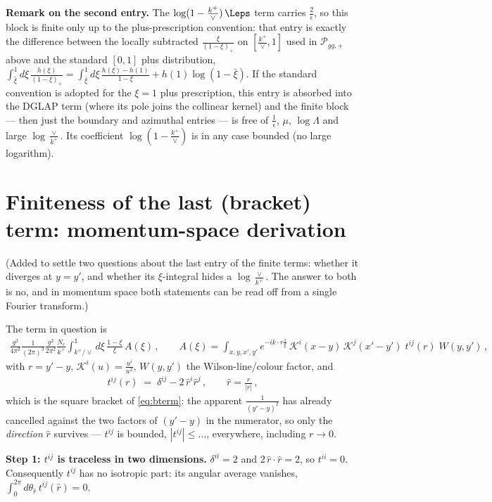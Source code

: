 \documentclass[9pt]{article}
\numberwithin{equation}{section}
\begin{document}
{\color{red}\textbf{Remark on the second entry.} The $\log(1-\frac{k^{+}}{\vee})\,\Leps$ term
carries $\frac{2}{\epsilon}$, so this block is finite only up to the plus-prescription
convention: that entry is exactly the difference between the locally subtracted
$\frac{\xi}{(1-\xi)_{+}}$ on $[\frac{k^{+}}{\vee},1]$ used in $\mathcal P_{gg,+}$ above and the
standard $[0,1]$ plus distribution,
$\int_{\bar\xi}^{1}d\xi\,\frac{h(\xi)}{(1-\xi)_{+}}
=\int_{\bar\xi}^{1}d\xi\,\frac{h(\xi)-h(1)}{1-\xi}+h(1)\log(1-\bar\xi)$.
If the standard convention is adopted for the $\xi=1$ plus prescription, this entry is
absorbed into the DGLAP term (where its pole joins the collinear kernel) and the finite block
--- then just the boundary and azimuthal entries --- is free of $\frac{1}{\epsilon}$, $\mu$,
$\log\Lambda$ and large $\log\frac{\vee}{k^{+}}$. Its coefficient
$\log(1-\frac{k^{+}}{\vee})$ is in any case bounded (no large logarithm).}

\section{Finiteness of the last (bracket) term: momentum-space derivation}
{\color{red}(Added to settle two questions about the last entry of the finite terms: whether
it diverges at $y=y'$, and whether its $\xi$-integral hides a $\log\frac{\vee}{k^{+}}$. The
answer to both is no, and in momentum space both statements can be read off from a single
Fourier transform.)}

The term in question is
\begin{align}\label{eq:bterm}
\frac{g^{2}}{4\pi^{2}}\frac{1}{(2\pi)^{3}}\frac{g^{2}}{2\pi^{2}}\frac{N_{c}}{k^{+}}
\int_{k^{+}/\vee}^{1}d\xi\,\frac{1-\xi}{\xi}\,A(\xi)\,,\qquad
A(\xi)=\int_{x,y,x',y'}e^{-ik\cdot r\frac{1}{\xi}}\,
\mathcal K^{i}(x-y)\,\mathcal K^{j}(x'-y')\;t^{ij}(r)\;W(y,y')\,,
\end{align}
with $r=y'-y$, $\mathcal K^{i}(u)=\frac{u^{i}}{u^{2}}$, $W(y,y')$ the Wilson-line/colour
factor, and
\begin{align}
t^{ij}(r)\;=\;\delta^{ij}-2\,\hat r^{i}\hat r^{j}\,,\qquad \hat r=\frac{r}{|r|}\,,
\end{align}
which is the square bracket of \eqref{eq:bterm}: the apparent $\frac{1}{(y'-y)^{2}}$ has
already cancelled against the two factors of $(y'-y)$ in the numerator, so only the
\emph{direction} $\hat r$ survives --- $t^{ij}$ is bounded, $|t^{ij}|\le\ldots$, everywhere,
including $r\to0$.

\textbf{Step 1: $t^{ij}$ is traceless in two dimensions.} $\delta^{ii}=2$ and
$2\,\hat r\cdot\hat r=2$, so $t^{ii}=0$. Consequently $t^{ij}$ has no isotropic part: its
angular average vanishes, $\int_{0}^{2\pi}d\theta_{\hat r}\,t^{ij}(\hat r)=0$.
\end{document}
